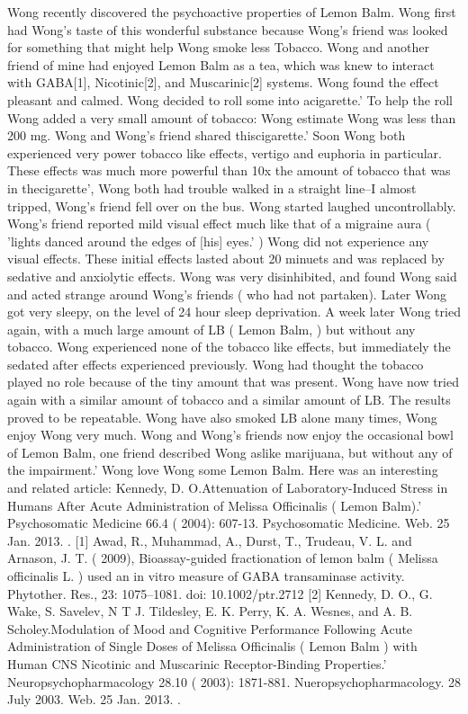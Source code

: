 \documentclass[12pt]{book}
\begin{document}
Wong recently discovered the psychoactive properties of Lemon Balm. Wong first had Wong's taste of this wonderful substance because Wong's friend was looked for something that might help Wong smoke less Tobacco. Wong and another friend of mine had enjoyed Lemon Balm as a tea, which was knew to interact with GABA[1], Nicotinic[2], and Muscarinic[2] systems. Wong found the effect pleasant and calmed. Wong decided to roll some into acigarette.' To help the roll Wong added a very small amount of tobacco: Wong estimate Wong was less than 200 mg. Wong and Wong's friend shared thiscigarette.' Soon Wong both experienced very power tobacco like effects, vertigo and euphoria in particular. These effects was much more powerful than 10x the amount of tobacco that was in thecigarette', Wong both had trouble walked in a straight line--I almost tripped, Wong's friend fell over on the bus. Wong started laughed uncontrollably. Wong's friend reported mild visual effect much like that of a migraine aura ( 'lights danced around the edges of [his] eyes.' ) Wong did not experience any visual effects. These initial effects lasted about 20 minuets and was replaced by sedative and anxiolytic effects. Wong was very disinhibited, and found Wong said and acted strange around Wong's friends ( who had not partaken). Later Wong got very sleepy, on the level of 24 hour sleep deprivation. A week later Wong tried again, with a much large amount of LB ( Lemon Balm, ) but without any tobacco. Wong experienced none of the tobacco like effects, but immediately the sedated after effects experienced previously. Wong had thought the tobacco played no role because of the tiny amount that was present. Wong have now tried again with a similar amount of tobacco and a similar amount of LB. The results proved to be repeatable. Wong have also smoked LB alone many times, Wong enjoy Wong very much. Wong and Wong's friends now enjoy the occasional bowl of Lemon Balm, one friend described Wong aslike marijuana, but without any of the impairment.' Wong love Wong some Lemon Balm. Here was an interesting and related article: Kennedy, D. O.Attenuation of Laboratory-Induced Stress in Humans After Acute Administration of Melissa Officinalis ( Lemon Balm).' Psychosomatic Medicine 66.4 ( 2004): 607-13. Psychosomatic Medicine. Web. 25 Jan. 2013. . [1] Awad, R., Muhammad, A., Durst, T., Trudeau, V. L. and Arnason, J. T. ( 2009), Bioassay-guided fractionation of lemon balm ( Melissa officinalis L. ) used an in vitro measure of GABA transaminase activity. Phytother. Res., 23: 1075--1081. doi: 10.1002/ptr.2712 [2] Kennedy, D. O., G. Wake, S. Savelev, N T J. Tildesley, E. K. Perry, K. A. Wesnes, and A. B. Scholey.Modulation of Mood and Cognitive Performance Following Acute Administration of Single Doses of Melissa Officinalis ( Lemon Balm ) with Human CNS Nicotinic and Muscarinic Receptor-Binding Properties.' Neuropsychopharmacology 28.10 ( 2003): 1871-881. Nueropsychopharmacology. 28 July 2003. Web. 25 Jan. 2013. .
\end{document}
